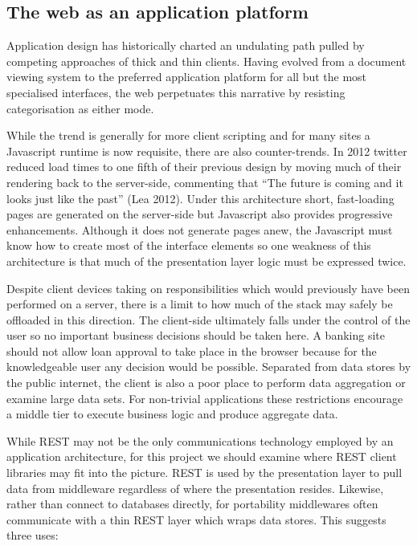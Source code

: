 \documentclass[12pt, ]{article}
\begin{document}
\subsection{The web as an application
platform}\label{the-web-as-an-application-platform}

Application design has historically charted an undulating path pulled by
competing approaches of thick and thin clients. Having evolved from a
document viewing system to the preferred application platform for all
but the most specialised interfaces, the web perpetuates this narrative
by resisting categorisation as either mode.

While the trend is generally for more client scripting and for many
sites a Javascript runtime is now requisite, there are also
counter-trends. In 2012 twitter reduced load times to one fifth of their
previous design by moving much of their rendering back to the
server-side, commenting that ``The future is coming and it looks just
like the past'' (Lea 2012). Under this architecture short, fast-loading
pages are generated on the server-side but Javascript also provides
progressive enhancements. Although it does not generate pages anew, the
Javascript must know how to create most of the interface elements so one
weakness of this architecture is that much of the presentation layer
logic must be expressed twice.

Despite client devices taking on responsibilities which would previously
have been performed on a server, there is a limit to how much of the
stack may safely be offloaded in this direction. The client-side
ultimately falls under the control of the user so no important business
decisions should be taken here. A banking site should not allow loan
approval to take place in the browser because for the knowledgeable user
any decision would be possible. Separated from data stores by the public
internet, the client is also a poor place to perform data aggregation or
examine large data sets. For non-trivial applications these restrictions
encourage a middle tier to execute business logic and produce aggregate
data.

While REST may not be the only communications technology employed by an
application architecture, for this project we should examine where REST
client libraries may fit into the picture. REST is used by the
presentation layer to pull data from middleware regardless of where the
presentation resides. Likewise, rather than connect to databases
directly, for portability middlewares often communicate with a thin REST
layer which wraps data stores. This suggests three uses:
\end{document}
